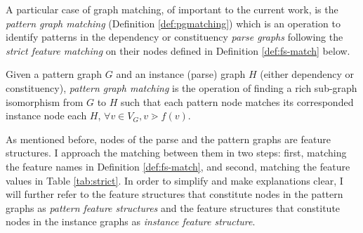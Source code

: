 %    

%

A particular case of graph matching, of important to the current work, is the \textit{pattern graph matching} (Definition \ref{def:pgmatching}) which is an operation to identify patterns in the dependency or constituency  \textit{parse graphs} following the \textit{strict feature matching} on their nodes defined in Definition \ref{def:fs-match} below. 

\begin{definition}\label{def:pgmatching}
    Given a pattern graph $G$ and an instance (parse) graph $H$ (either dependency or constituency), \textit{pattern graph matching} is the operation of finding a rich sub-graph isomorphism from $G$ to $H$ such that each pattern node matches its corresponded instance node each $H$, $\forall v \in V_G, v \gtrdot f(v)$. 
\end{definition}


As mentioned before, nodes of the parse and the pattern graphs are feature structures. I approach the matching between them in two steps: first, matching the feature names in Definition \ref{def:fs-match}, and second,  matching the feature values in Table \ref{tab:strict}. 
In order to simplify and make explanations clear, I will further refer to the feature structures that constitute nodes in the pattern graphs as \textit{pattern feature structures} and the feature structures that constitute nodes in the instance graphs as \textit{instance feature structure}.

